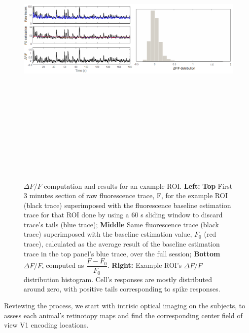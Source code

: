 \begin{figure}[H] \centering \includegraphics[width=15cm,height=15cm,keepaspectratio]{Figures/7.Results/ftraces/dFoverF.png} 
\caption{$\Delta F/F$ computation and results for an example ROI.
\newline \textbf{Left:} \textbf{Top} First 3 minutes section of raw fluorescence trace, F, for the example ROI (black trace) superimposed with the fluorescence baseline estimation trace for that ROI done by using a 60 s sliding window to discard trace's tails (blue trace); \textbf{Middle} Same fluorescence trace (black trace) superimposed with the baseline estimation value, $F_0$ (red trace), calculated as the average result of the baseline estimation trace in the top panel's blue trace, over the full session; \textbf{Bottom} $\Delta F/F$, computed as $\dfrac{F-F_0}{F_0}$.
\newline \textbf{Right:} Example ROI's $\Delta F/F$ distribution histogram. Cell's responses are mostly distributed around zero, with positive tails corresponding to spike responses.
\label{dfoverf}}
\end{figure}

Reviewing the process, we start with intrisic optical imaging on the subjects, to assess each animal's retinotopy maps and find the corresponding center field of view V1 encoding locations. 

